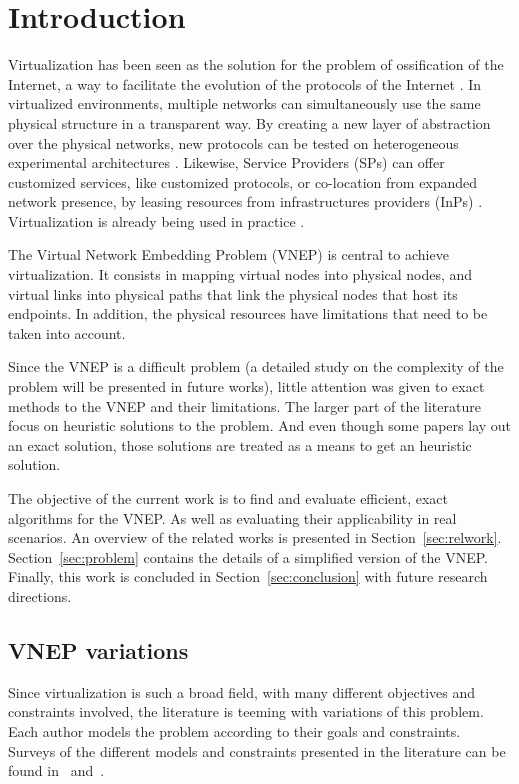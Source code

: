 \section{Introduction}
Virtualization has been seen as the solution for the problem of ossification of the Internet, a way to facilitate the evolution of the protocols of the Internet \cite{Anderson2005}. In virtualized environments, multiple networks can simultaneously use the same physical structure in a transparent way. By creating a new layer of abstraction over the physical networks, new protocols can be tested on heterogeneous experimental architectures \cite{Anderson06geni}. Likewise, Service Providers (SPs) can offer customized services, like customized protocols, or co-location from expanded network presence, by leasing resources from infrastructures providers (InPs) \cite{Feamster:2007}. Virtualization is already being used in practice \cite{Carapinha:2009, Anderson06geni}.

The Virtual Network Embedding Problem (VNEP) is central to achieve virtualization. It consists in mapping virtual nodes into physical nodes, and virtual links into physical paths that link the physical nodes that host its endpoints. In addition, the physical resources have limitations that need to be taken into account.

Since the VNEP is a difficult problem (a detailed study on the complexity of the problem will be presented in future works), little attention was given to exact methods to the VNEP and their limitations. The larger part of the literature focus on heuristic solutions to the problem. And even though some papers lay out an exact solution, those solutions are treated as a means to get an heuristic solution.

The objective of the current work is to find and evaluate efficient, exact algorithms for the VNEP\@. As well as evaluating their applicability in real scenarios. An overview of the related works is presented in Section~\ref{sec:relwork}. Section~\ref{sec:problem} contains the details of a simplified version of the VNEP\@. Finally, this work is concluded in Section~\ref{sec:conclusion} with future research directions.

\subsection{VNEP variations}
Since virtualization is such a broad field, with many different objectives and constraints involved, the literature is teeming with variations of this problem. Each author models the problem according to their goals and constraints. Surveys of the different models and constraints presented in the literature can be found in~\cite{Chowdhury2010} and~\cite{FischerSurvey}.

